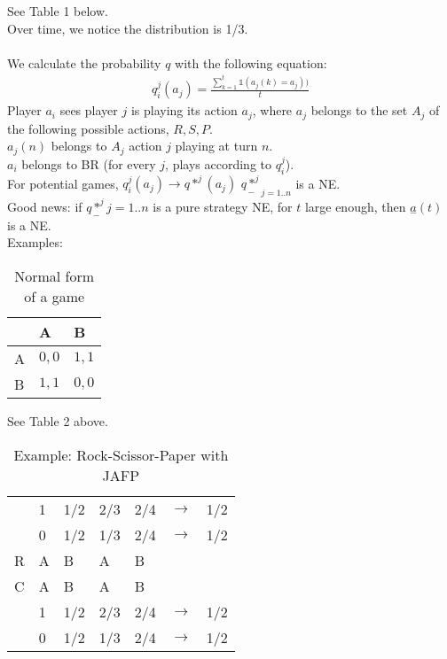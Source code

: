 See Table 1 below.\\
Over time, we notice the distribution is 1/3.\\
\\
We calculate the probability $q$ with the following equation:
\begin{equation}\label{eq:13}
\begin{aligned}
q_i^j(a_j) = \frac{\sum_{k = 1}^t \mathbb{1}(a_j(k) = a_j))}{t}
\end{aligned}
\end{equation}
Player $a_i$ sees player $j$ is playing its action $a_j$, where $a_j$ belongs to the set $A_j$ of the following possible actions, ${ R, S, P }$.\\
$a_j(n)$ belongs to $A_j$ action $j$ playing at turn $n$.\\
$a_i$ belongs to BR (for every $j$, plays according to $q_i^j$).\\
For potential games, $q_i^j(a_j) \rightarrow q*^j(a_j)$ $\underset{-}{q*^j}_{j=1..n}$ is a NE.\\
Good news: if $\underset{-}{q*^j} {j=1..n}$ is a pure strategy NE, for $t$ large enough, then $\underset{-}{a}(t)$ is a NE.\\
Examples:\\
\begin{table}
	\centering
	\begin{tabular}{| l | l | l |}
\hline
  & A      & B \\ \hline
A & $0, 0$ & $1, 1$\\
B & $1, 1$ & $0, 0$\\ \hline
	\end{tabular}
	\caption{Normal form of a game}\label{tab:b} 
\end{table}
See Table 2 above.\\
\begin{table}
    \centering
	\begin{tabular}{| l | l | l | l | l | l | l |}
\hline
 & 1 & 1/2 & 2/3 & 2/4 & $\rightarrow$ & 1/2\\
 & 0 & 1/2 & 1/3 & 2/4 & $\rightarrow$ & 1/2\\ \hline
R & A & B & A & B & & \\
C & A & B & A & B & & \\ \hline
 & 1 & 1/2 & 2/3 & 2/4 & $\rightarrow$ & 1/2\\
 & 0 & 1/2 & 1/3 & 2/4 & $\rightarrow$ & 1/2\\ \hline
	\end{tabular}
	\caption{Example: Rock-Scissor-Paper with JAFP}\label{tab:c}
\end{table}

